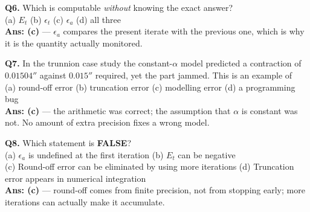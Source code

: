 \begin{mcqbox}
\textbf{Q6.} Which is computable \emph{without} knowing the exact answer?\\
(a) $E_t$ \quad (b) $\epsilon_t$ \quad (c) $\epsilon_a$ \quad (d) all three\\
\textbf{Ans: (c)} --- $\epsilon_a$ compares the present iterate with the previous one, which is why it is the quantity actually monitored.

\textbf{Q7.} In the trunnion case study the constant-$\alpha$ model predicted a contraction of $0.01504''$ against $0.015''$ required, yet the part jammed. This is an example of\\
(a) round-off error \quad (b) truncation error \quad (c) modelling error \quad (d) a programming bug\\
\textbf{Ans: (c)} --- the arithmetic was correct; the assumption that $\alpha$ is constant was not. No amount of extra precision fixes a wrong model.

\textbf{Q8.} Which statement is \textbf{FALSE}?\\
(a) $\epsilon_a$ is undefined at the first iteration \quad (b) $E_t$ can be negative\\
(c) Round-off error can be eliminated by using more iterations \quad (d) Truncation error appears in numerical integration\\
\textbf{Ans: (c)} --- round-off comes from finite precision, not from stopping early; more iterations can actually make it accumulate.
\end{mcqbox}

